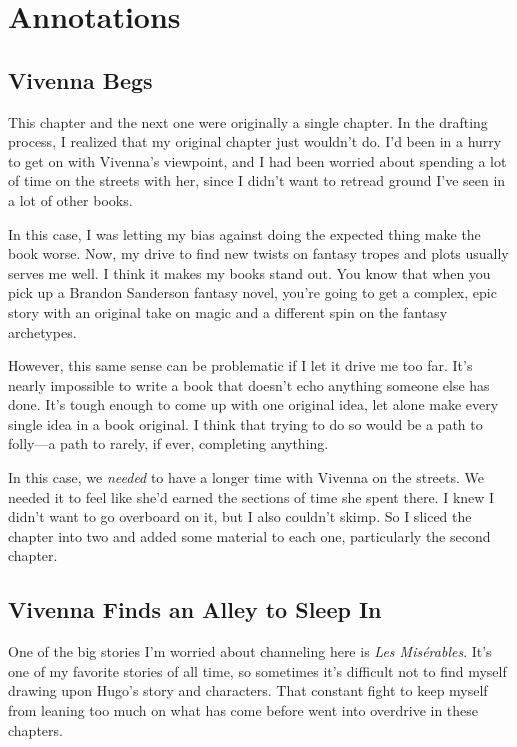 \section*{Annotations}

\subsection*{Vivenna Begs}

This chapter and the next one were originally a single chapter. In the drafting process, I realized that my original chapter just wouldn’t do. I’d been in a hurry to get on with Vivenna’s viewpoint, and I had been worried about spending a lot of time on the streets with her, since I didn’t want to retread ground I’ve seen in a lot of other books.

In this case, I was letting my bias against doing the expected thing make the book worse. Now, my drive to find new twists on fantasy tropes and plots usually serves me well. I think it makes my books stand out. You know that when you pick up a Brandon Sanderson fantasy novel, you’re going to get a complex, epic story with an original take on magic and a different spin on the fantasy archetypes.

However, this same sense can be problematic if I let it drive me too far. It’s nearly impossible to write a book that doesn’t echo anything someone else has done. It’s tough enough to come up with one original idea, let alone make every single idea in a book original. I think that trying to do so would be a path to folly—a path to rarely, if ever, completing anything.

In this case, we \textit{needed} to have a longer time with Vivenna on the streets. We needed it to feel like she’d earned the sections of time she spent there. I knew I didn’t want to go overboard on it, but I also couldn’t skimp. So I sliced the chapter into two and added some material to each one, particularly the second chapter.

\subsection*{Vivenna Finds an Alley to Sleep In}

One of the big stories I’m worried about channeling here is \textit{Les Misérables}. It’s one of my favorite stories of all time, so sometimes it’s difficult not to find myself drawing upon Hugo’s story and characters. That constant fight to keep myself from leaning too much on what has come before went into overdrive in these chapters.

